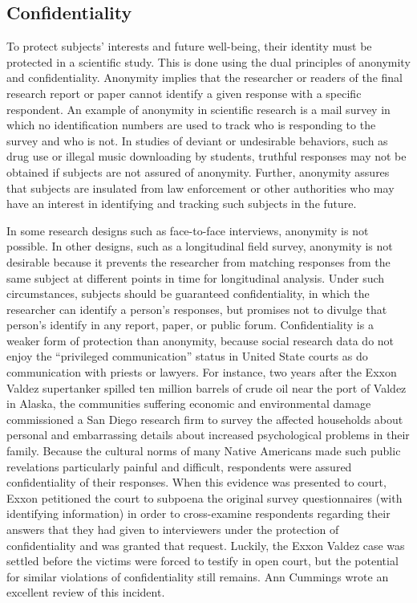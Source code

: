 \subsection{Confidentiality}

To protect subjects' interests and future well-being, their identity must be protected in a scientific study. This is done using the dual principles of anonymity and confidentiality. Anonymity implies that the researcher or readers of the final research report or paper cannot identify a given response with a specific respondent. An example of anonymity in scientific research is a mail survey in which no identification numbers are used to track who is responding to the survey and who is not. In studies of deviant or undesirable behaviors, such as drug use or illegal music downloading by students, truthful responses may not be obtained if subjects are not assured of anonymity. Further, anonymity assures that subjects are insulated from law enforcement or other authorities who may have an interest in identifying and tracking such subjects in the future.

In some research designs such as face-to-face interviews, anonymity is not possible. In other designs, such as a longitudinal field survey, anonymity is not desirable because it prevents the researcher from matching responses from the same subject at different points in time for longitudinal analysis. Under such circumstances, subjects should be guaranteed confidentiality, in which the researcher can identify a person's responses, but promises not to divulge that person's identify in any report, paper, or public forum. Confidentiality is a weaker form of protection than anonymity, because social research data do not enjoy the ``privileged communication'' status in United State courts as do communication with priests or lawyers. For instance, two years after the Exxon Valdez supertanker spilled ten million barrels of crude oil near the port of Valdez in Alaska, the communities suffering economic and environmental damage commissioned a San Diego research firm to survey the affected households about personal and embarrassing details about increased psychological problems in their family. Because the cultural norms of many Native Americans made such public revelations particularly painful and difficult, respondents were assured confidentiality of their responses. When this evidence was presented to court, Exxon petitioned the court to subpoena the original survey questionnaires (with identifying information) in order to cross-examine respondents regarding their answers that they had given to interviewers under the protection of confidentiality and was granted that request. Luckily, the Exxon Valdez case was settled before the victims were forced to testify in open court, but the potential for similar violations of confidentiality still remains. Ann Cummings\cite{cummings1992exxon} wrote an excellent review of this incident.

